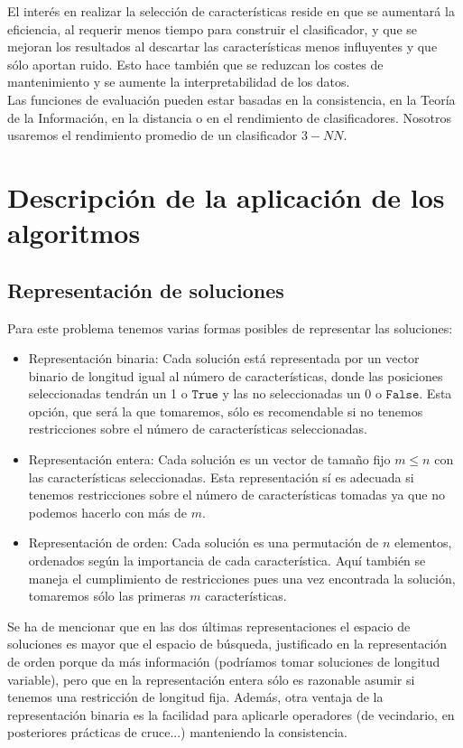 \documentclass[11pt,leqno]{article}
\begin{document}
El interés en realizar la selección de características reside en que se aumentará la eficiencia, al requerir menos tiempo para construir el clasificador, y que se mejoran los resultados al descartar las características menos influyentes y que sólo aportan ruido. Esto hace también que se reduzcan los costes de mantenimiento y se aumente la interpretabilidad de los datos.\\
Las funciones de evaluación pueden estar basadas en la consistencia, en la Teoría de la Información, en la distancia o en el rendimiento de clasificadores. Nosotros usaremos el rendimiento promedio de un clasificador $3-NN$.


\section{Descripción de la aplicación de los algoritmos}
\subsection{Representación de soluciones}
	Para este problema tenemos varias formas posibles de representar las soluciones:
	\begin{itemize}
		\item Representación binaria: Cada solución está representada por un vector binario de longitud igual al número de características, donde las posiciones seleccionadas tendrán un 1 o $\texttt{True}$ y las no seleccionadas un 0 o $\texttt{False}$. Esta opción, que será la que tomaremos, sólo es recomendable si no tenemos restricciones sobre el número de características seleccionadas.
		\item Representación entera: Cada solución es un vector de tamaño fijo $m \leq n$ con las características seleccionadas. Esta representación sí es adecuada si tenemos restricciones sobre el número de características tomadas ya que no podemos hacerlo con más de $m$.
		\item Representación de orden: Cada solución es una permutación de $n$ elementos, ordenados según la importancia de cada característica. Aquí también se maneja el cumplimiento de restricciones pues una vez encontrada la solución, tomaremos sólo las primeras $m$ características.
	\end{itemize}
	Se ha de mencionar que en las dos últimas representaciones el espacio de soluciones es mayor que el espacio de búsqueda, justificado en la representación de orden porque da más información (podríamos tomar soluciones de longitud variable), pero que en la representación entera sólo es razonable asumir si tenemos una restricción de longitud fija. Además, otra ventaja de la representación binaria es la facilidad para aplicarle operadores (de vecindario, en posteriores prácticas de cruce...) manteniendo la consistencia.
\end{document}
